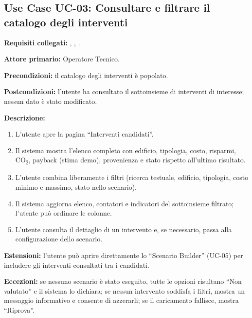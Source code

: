 \subsection*{Use Case UC-03: Consultare e filtrare il catalogo degli interventi}
\textbf{Requisiti collegati:} , , .\par
\textbf{Attore primario:} Operatore Tecnico.\par
\textbf{Precondizioni:} il catalogo degli interventi è popolato.\par
\textbf{Postcondizioni:} l'utente ha consultato il sottoinsieme di interventi di interesse; nessun dato è stato modificato.\par
\textbf{Descrizione:}
\begin{enumerate}[leftmargin=1.6em, itemsep=0.1em]
    \item L'utente apre la pagina ``Interventi candidati''.
    \item Il sistema mostra l'elenco completo con edificio, tipologia, costo, risparmi, CO\textsubscript{2}, payback (stima demo), provenienza e stato rispetto all'ultimo risultato.
    \item L'utente combina liberamente i filtri (ricerca testuale, edificio, tipologia, costo minimo e massimo, stato nello scenario).
    \item Il sistema aggiorna elenco, contatori e indicatori del sottoinsieme filtrato; l'utente può ordinare le colonne.
    \item L'utente consulta il dettaglio di un intervento e, se necessario, passa alla configurazione dello scenario.
\end{enumerate}
\textbf{Estensioni:} l'utente può aprire direttamente lo ``Scenario Builder'' (UC-05) per includere gli interventi consultati tra i candidati.\par
\textbf{Eccezioni:} se nessuno scenario è stato eseguito, tutte le opzioni risultano ``Non valutato'' e il sistema lo dichiara; se nessun intervento soddisfa i filtri, mostra un messaggio informativo e consente di azzerarli; se il caricamento fallisce, mostra ``Riprova''.

